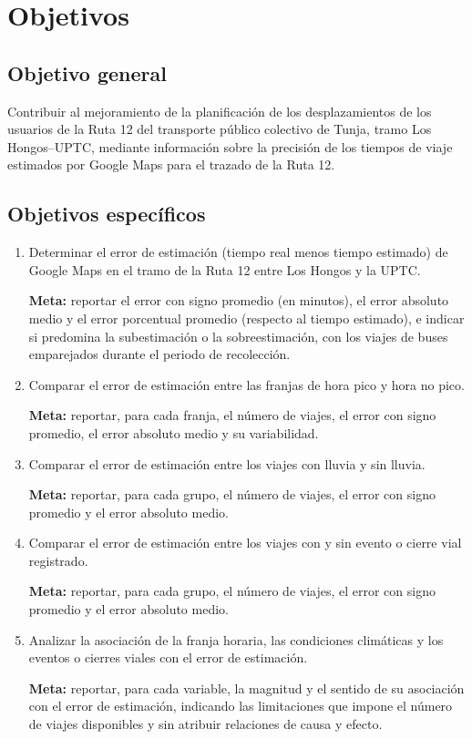 \section{Objetivos}

\subsection{Objetivo general}

Contribuir al mejoramiento de la planificación de los desplazamientos de los usuarios de la Ruta 12 del transporte público colectivo de Tunja, tramo Los Hongos--UPTC, mediante información sobre la precisión de los tiempos de viaje estimados por Google Maps para el trazado de la Ruta 12.

\subsection{Objetivos específicos}

\begin{enumerate}
    \item Determinar el error de estimación (tiempo real menos tiempo estimado) de Google Maps en el tramo de la Ruta 12 entre Los Hongos y la UPTC.

    \textbf{Meta:} reportar el error con signo promedio (en minutos), el error absoluto medio y el error porcentual promedio (respecto al tiempo estimado), e indicar si predomina la subestimación o la sobreestimación, con los viajes de buses emparejados durante el periodo de recolección.

    \item Comparar el error de estimación entre las franjas de hora pico y hora no pico.

    \textbf{Meta:} reportar, para cada franja, el número de viajes, el error con signo promedio, el error absoluto medio y su variabilidad.

    \item Comparar el error de estimación entre los viajes con lluvia y sin lluvia.

    \textbf{Meta:} reportar, para cada grupo, el número de viajes, el error con signo promedio y el error absoluto medio.

    \item Comparar el error de estimación entre los viajes con y sin evento o cierre vial registrado.

    \textbf{Meta:} reportar, para cada grupo, el número de viajes, el error con signo promedio y el error absoluto medio.

    \item Analizar la asociación de la franja horaria, las condiciones climáticas y los eventos o cierres viales con el error de estimación.

    \textbf{Meta:} reportar, para cada variable, la magnitud y el sentido de su asociación con el error de estimación, indicando las limitaciones que impone el número de viajes disponibles y sin atribuir relaciones de causa y efecto.
\end{enumerate}